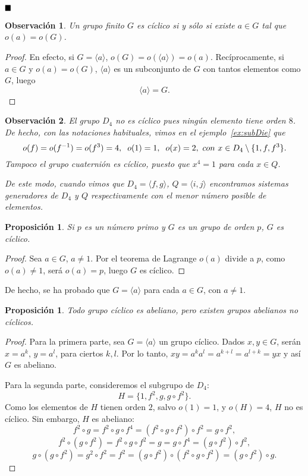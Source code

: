 \documentclass[12pt]{article}
\newtheorem{proposition}[theorem]{Proposición}
\newtheorem{observation}{Observación}[theorem]
\begin{document}
$\hfill \blacksquare$

\begin{observation}Un grupo finito $G$ es cíclico si y sólo si existe $a \in G$ tal que $o(a) = o(G)$.
\end{observation}
\begin{proof}
En efecto, si $G = \langle a \rangle$, $o(G) = o(\langle a \rangle) = o(a)$. Recíprocamente, si $a \in G$ y $o(a) = o(G)$, $\langle a \rangle$ es un subconjunto de $G$ con tantos elementos como $G$, luego $$\langle a \rangle = G.$$

\end{proof}

\begin{observation}El grupo $D_4$ no es cíclico pues ningún elemento tiene orden $8$. De hecho, con las notaciones habituales, vimos en el ejemplo~\ref{ex:subDie} que $$o(f) = o(f^{-1}) = o(f^3) = 4,\hspace{0.2cm} o(1)=1,\hspace{0.2cm} o(x) = 2,~con~ x \in D_4 \setminus \lbrace 1, f, f^3 \rbrace.$$
Tampoco el grupo cuaternión es cíclico, puesto que $x^4= 1$ para cada $x \in Q$.

De este modo, cuando vimos que $D_4 = \langle f,g \rangle$, $Q = \langle i,j \rangle$ encontramos sistemas generadores de $D_4$ y $Q$ respectivamente con el menor número posible de elementos.
\end{observation}

\begin{proposition}Si $p$ es un número primo y $G$ es un grupo de orden $p$, $G$ es cíclico.
\end{proposition}
\begin{proof}
Sea $a\in G$, $a \neq 1$. Por el teorema de Lagrange $o(a)$ divide a $p$, como $o(a) \neq 1$, será $o(a) = p$, luego $G$ es cíclico.

\end{proof}

De hecho, se ha probado que $G = \langle a \rangle$ para cada $a \in G$, con $a \neq 1$.

\begin{proposition}\label{prop:abnocic} Todo grupo cíclico es abeliano, pero existen grupos abelianos no cíclicos.
\end{proposition}
\begin{proof}
Para la primera parte, sea $G = \langle a \rangle$ un grupo cíclico. Dados $x,y \in G$, serán $x = a^k$, $y = a^l$, para ciertos $k,l$. Por lo tanto, $xy = a^ka^l = a^{k+l} = a^{l+k} = yx$ y así $G$ es abeliano.

Para la segunda parte, consideremos el subgrupo de $D_4$: $$H = \lbrace 1,f^2, g, g \circ f^2 \rbrace.$$ Como los elementos de $H$ tienen orden $2$, salvo $o(1) = 1$, y $o(H) = 4$, $H$ no es cíclico. Sin embargo, $H$ es abeliano: $$f^2 \circ g  = f^2 \circ g \circ f^4 = (f^2 \circ g \circ f^2) \circ f^2 = g \circ f^2,$$ $$f^2 \circ (g \circ f^2) = f^2 \circ g \circ f^2 = g = g \circ f^4 = (g \circ f^2) \circ f^2,$$ $$g \circ (g \circ f^2) = g^2 \circ f^2 = f^2 = (g \circ f^2) \circ (f^2 \circ g \circ f^2) = (g \circ f^2) \circ g.$$

\end{proof}
\end{document}
